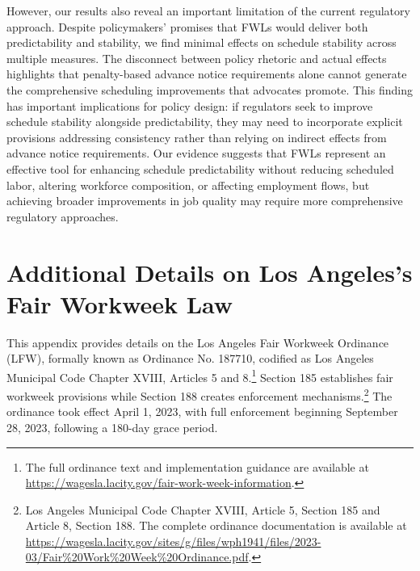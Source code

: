 \documentclass[letterpaper,11pt,leqno]{article}
\theoremstyle{paper}
\renewcommand{\thetable}{A\arabic{table}}
\renewcommand{\thefigure}{A\arabic{figure}}
\newcommand{\bib}{bibliography.bib}
\begin{document}
However, our results also reveal an important limitation of the current regulatory approach. Despite policymakers' promises that FWLs would deliver both predictability and stability, we find minimal effects on schedule stability across multiple measures. The disconnect between policy rhetoric and actual effects highlights that penalty-based advance notice requirements alone cannot generate the comprehensive scheduling improvements that advocates promote. This finding has important implications for policy design: if regulators seek to improve schedule stability alongside predictability, they may need to incorporate explicit provisions addressing consistency rather than relying on indirect effects from advance notice requirements. Our evidence suggests that FWLs represent an effective tool for enhancing schedule predictability without reducing scheduled labor, altering workforce composition, or affecting employment flows, but achieving broader improvements in job quality may require more comprehensive regulatory approaches.



\pagebreak 

\newpage 
\setcounter{page}{1}

\appendix
\renewcommand{\thefigure}{A\arabic{figure}}
\renewcommand{\thetable}{A\arabic{table}}
\setcounter{figure}{0}  %
\setcounter{table}{0}   %

\section{Additional Details on Los Angeles's Fair Workweek Law} \label{subsec:fwl_details}

This appendix provides details on the Los Angeles Fair Workweek Ordinance (LFW), formally known as Ordinance No. 187710, codified as Los Angeles Municipal Code Chapter XVIII, Articles 5 and 8.\footnote{The full ordinance text and implementation guidance are available at \url{https://wagesla.lacity.gov/fair-work-week-information}.} Section 185 establishes fair workweek provisions while Section 188 creates enforcement mechanisms.\footnote{Los Angeles Municipal Code Chapter XVIII, Article 5, Section 185 and Article 8, Section 188. The complete ordinance documentation is available at \url{https://wagesla.lacity.gov/sites/g/files/wph1941/files/2023-03/Fair\%20Work\%20Week\%20Ordinance.pdf}.} The ordinance took effect April 1, 2023, with full enforcement beginning September 28, 2023, following a 180-day grace period.
\end{document}
